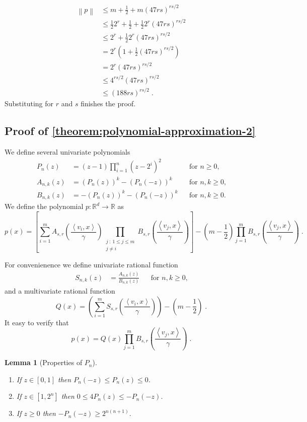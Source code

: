 \documentclass[12pt]{article}
\newtheorem{lemma}[definition]{Lemma}
\newcommand{\R}{\mathbb{R}}  %
\newcommand{\ip}[2]{\left\langle #1, #2 \right\rangle} %
\newcommand{\norm}[1]{\left\| #1 \right\|}  %
\begin{document}
\begin{align*}
\norm{p}
& \le m + \frac{1}{2} + m \left(47 rs \right)^{rs/2} \\
& \le \frac{1}{2} 2^r + \frac{1}{2} + \frac{1}{2} 2^r \left(47 rs \right)^{rs/2} \\
& \le 2^r + \frac{1}{2} 2^r \left(47 rs \right)^{rs/2} \\
& = 2^r \left(1 + \frac{1}{2} \left(47 rs \right)^{rs/2} \right) \\
& = 2^r \left(47 rs \right)^{rs/2} \\
& \le 4^{rs/2} \left(47 rs \right)^{rs/2} \\
& \le \left(188 rs \right)^{rs/2} \; .
\end{align*}
Substituting for $r$ and $s$ finishes the proof.


\subsection{Proof of \autoref{theorem:polynomial-approximation-2}}
\label{section:proof-of-polynomial-approximation-2}

We define several univariate polynomials
\begin{align*}
P_n(z) & = (z - 1) \prod_{i=1}^n (z - 2^i)^2 && \text{for $n \ge 0$,} \\
A_{n,k}(z) & = (P_n(z))^k - (P_n(-z))^k && \text{for $n,k \ge 0$,} \\
B_{n,k}(z) & = - (P_n(z))^k - (P_n(-z))^k && \text{for $n,k \ge 0$.}
\end{align*}
We define the polynomial $p:\R^d \to \R$ as
$$
p(x) = \left[ \sum_{i=1}^m A_{s,r}\left( \frac{\ip{v_i}{x}}{\gamma} \right) \prod_{\substack{j ~:~ 1 \le j \le m \\ j \neq i}} B_{s,r} \left( \frac{\ip{v_j}{x}}{\gamma} \right) \right]
- \left(m - \frac{1}{2} \right) \prod_{j=1}^m B_{s,r} \left( \frac{\ip{v_j}{x}}{\gamma} \right) \; .
$$

For convenienence we define univariate rational function
\begin{align*}
S_{n,k}(z) & = \frac{A_{n,k}(z)}{B_{n,k}(z)} && \text{for $n,k \ge 0$,}
\end{align*}
and a multivariate rational function
$$
Q(x) = \left( \sum_{i=1}^m S_{s,r}\left( \frac{\ip{v_i}{x}}{\gamma} \right) \right) - \left(m - \frac{1}{2} \right) \; .
$$
It easy to verify that
$$
p(x) = Q(x) \prod_{j=1}^m B_{s,r} \left( \frac{\ip{v_j}{x}}{\gamma} \right) \; .
$$

\begin{lemma}[Properties of $P_n$]
\label{lemma:properties-of-p-n}
\hspace{1cm} %
\begin{enumerate}
\item If $z \in [0,1]$ then $P_n(-z) \le P_n(z) \le 0$.
\item If $z \in [1,2^n]$ then $0 \le 4P_n(z) \le -P_n(-z)$.
\item If $z \ge 0$ then $-P_n(-z) \ge 2^{n(n+1)}$.
\end{enumerate}
\end{lemma}
\end{document}
